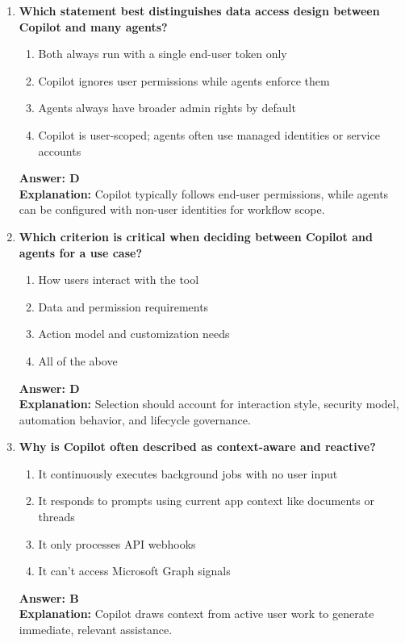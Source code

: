 \documentclass[10pt]{article}
\begin{document}
\begin{enumerate}[leftmargin=*]
\item \textbf{Which statement best distinguishes data access design between Copilot and many agents?}
\begin{enumerate}[label=\Alph*.]
  \item Both always run with a single end-user token only
  \item Copilot ignores user permissions while agents enforce them
  \item Agents always have broader admin rights by default
  \item Copilot is user-scoped; agents often use managed identities or service accounts
\end{enumerate}
\textbf{Answer: D}\\
\textbf{Explanation:} Copilot typically follows end-user permissions, while agents can be configured with non-user identities for workflow scope.

\item \textbf{Which criterion is critical when deciding between Copilot and agents for a use case?}
\begin{enumerate}[label=\Alph*.]
  \item How users interact with the tool
  \item Data and permission requirements
  \item Action model and customization needs
  \item All of the above
\end{enumerate}
\textbf{Answer: D}\\
\textbf{Explanation:} Selection should account for interaction style, security model, automation behavior, and lifecycle governance.

\item \textbf{Why is Copilot often described as context-aware and reactive?}
\begin{enumerate}[label=\Alph*.]
  \item It continuously executes background jobs with no user input
  \item It responds to prompts using current app context like documents or threads
  \item It only processes API webhooks
  \item It can’t access Microsoft Graph signals
\end{enumerate}
\textbf{Answer: B}\\
\textbf{Explanation:} Copilot draws context from active user work to generate immediate, relevant assistance.


\end{enumerate}
\end{document}
